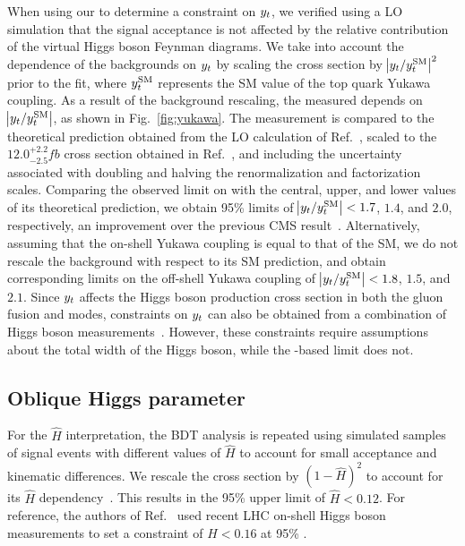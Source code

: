 When using our \tttt to determine a constraint on $y_{t}$, we verified
using a LO simulation that the signal acceptance is not affected by the
relative contribution of the virtual Higgs boson Feynman diagrams. We take
into account the dependence of the backgrounds on $y_{t}$ by scaling the
\ttH cross section by $\abs{y_{t}/y_{t}^{\mathrm{SM}}}^2$ prior to the
fit, where $y_{t}^{\mathrm{SM}}$ represents the SM value of the top quark
Yukawa coupling. As a result of the \ttH background rescaling, the measured
\xsectttt depends on $\abs{y_{t}/y_{t}^{\mathrm{SM}}}$, as shown in
Fig.~\ref{fig:yukawa}. The measurement is compared to the theoretical
prediction obtained from the LO calculation of Ref.~\cite{THEORY:TopYukawaTTTT},
scaled to the $12.0^{+2.2}_{-2.5}\unit{fb}$ cross section obtained in
Ref.~\cite{THEORY:Frederix2017wme}, and including the uncertainty associated with
doubling and halving the renormalization and factorization scales. Comparing
the observed limit on \xsectttt with the central, upper, and lower values of
its theoretical prediction, we obtain 95\% \CL limits of
$\abs{y_{t}/y_{t}^{\mathrm{SM}}} < 1.7$, $1.4$, and $2.0$,
respectively, an improvement over the previous CMS
result~\cite{CMS:myTOP2016}. Alternatively, assuming that the on-shell Yukawa
coupling is equal to that of the SM, we do not rescale the \ttH background
with respect to its SM prediction, and obtain corresponding limits on the
off-shell Yukawa coupling of $\abs{y_{t}/y_{t}^{\mathrm{SM}}} < 1.8$,
$1.5$, and $2.1$. Since $y_{t}$ affects the Higgs boson production cross
section in both the gluon fusion and \ttH modes, constraints on $y_{t}$
can also be obtained from a combination of Higgs boson
measurements~\cite{STAT:AtlasCmsHiggsComb}. However, these constraints require
assumptions about the total width of the Higgs boson, while the \tttt-based
limit does not. 

\subsection{Oblique Higgs parameter}

For the $\hat{H}$ interpretation, the BDT analysis is
repeated using simulated samples of \tttt signal events with different values
of $\hat{H}$ to account for small acceptance and kinematic differences. 
We rescale the \ttH cross section by
$(1-\hat{H})^2$ to account for its $\hat{H}$
dependency~\cite{THEORY:ObliqueHiggs2019}. This results in the 95\% \CL upper limit
of $\hat{H} < 0.12$. For reference, the authors of
Ref.~\cite{THEORY:ObliqueHiggs2019} used recent LHC on-shell Higgs boson
measurements to set a constraint of $\hat{H} < 0.16$ at 95\% \CL.


